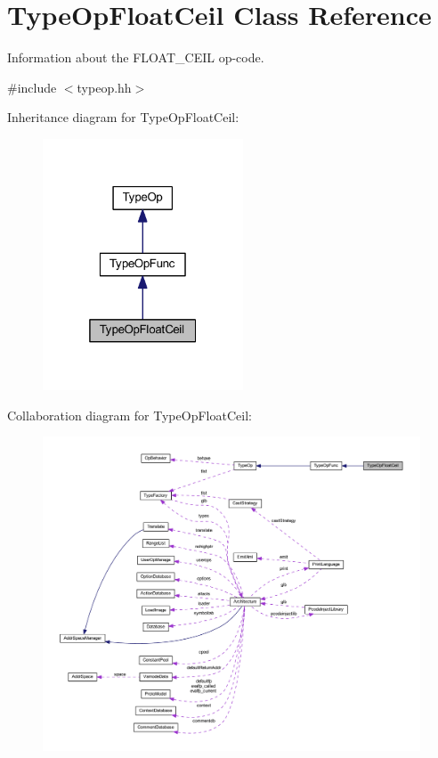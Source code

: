 \hypertarget{class_type_op_float_ceil}{}\section{Type\+Op\+Float\+Ceil Class Reference}
\label{class_type_op_float_ceil}


Information about the F\+L\+O\+A\+T\+\_\+\+C\+E\+IL op-\/code.  




{\ttfamily \#include $<$typeop.\+hh$>$}



Inheritance diagram for Type\+Op\+Float\+Ceil\+:
\nopagebreak
\begin{figure}[H]
\begin{center}
\leavevmode
\includegraphics[width=169pt]{class_type_op_float_ceil__inherit__graph}
\end{center}
\end{figure}


Collaboration diagram for Type\+Op\+Float\+Ceil\+:
\nopagebreak
\begin{figure}[H]
\begin{center}
\leavevmode
\includegraphics[width=350pt]{class_type_op_float_ceil__coll__graph}
\end{center}
\end{figure}
